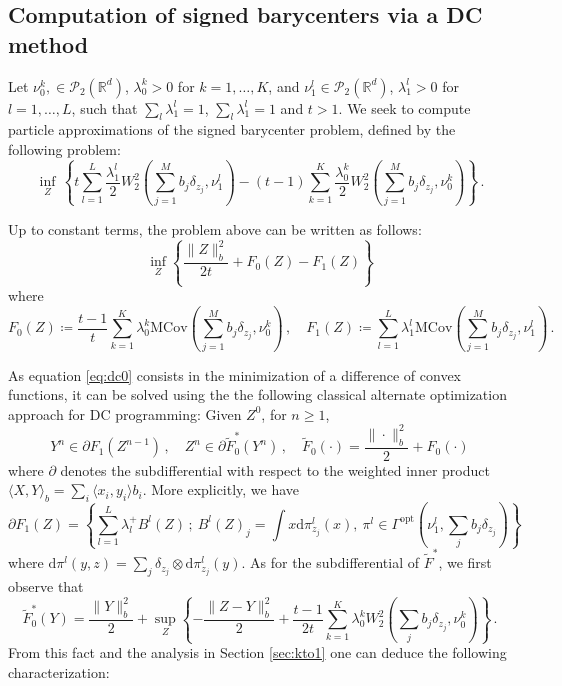 \documentclass[12pt]{amsart}
\numberwithin{equation}{section}
\let\mr=\mathrm
\theoremstyle{plain}
\theoremstyle{definition}
\begin{document}
\subsection{Computation of signed barycenters via a DC method}\label{sec:signeddc}
Let $\nu_0^k, \in \mathcal{P}_2(\mathbb{R}^d)$, $\lambda_0^k>0$ for $k=1,\ldots,K$, and $\nu_1^l \in \mathcal{P}_2(\mathbb{R}^d)$, $\lambda_1^l>0$ for $l=1,\ldots,L$, such that $\sum_l \lambda_1^l =1$, $\sum_l \lambda_1^l =1$ and $t>1$. We seek to compute particle approximations of the signed barycenter problem, defined by the following problem:
\[\inf_{Z} \, \left\{ t \sum_{l=1}^L \frac{\lambda_1^l}{2}  W^2_2\left(\sum_{j=1}^M b_j \delta_{z_j}, \nu_1^l \right) - (t-1)\sum_{k=1}^K \frac{\lambda_0^k}{2} W^2_2\left(\sum_{j=1}^M b_j \delta_{z_j}, \nu_0^k \right)\right\}\,.
\]


Up to constant terms, the problem above can be written as follows:
\begin{equation}\label{eq:dc0}
\inf_{Z} \left\{ \frac{\|Z\|_b^2}{2t} + F_0(Z) - F_1(Z) \right\}
\end{equation}
where
\[
 F_0(Z) \coloneqq \frac{t-1}{t} \sum_{k=1}^K \lambda_0^k \mathrm{MCov}\left( \sum_{j=1}^M b_j \delta_{z_j}, \nu_0^k \right)\,, \quad F_1(Z) \coloneqq \sum_{l=1}^L \lambda_1^l \mathrm{MCov}\left( \sum_{j=1}^M b_j \delta_{z_j}, \nu_1^l \right) \,.
\]

As equation \eqref{eq:dc0}  consists in the minimization of a difference of convex functions, it can be solved using the the following classical alternate optimization approach for DC programming:  Given $Z^0$, for $n\geq 1$,
\begin{equation}\label{eq:dc}
Y^n \in \partial F_1(Z^{n-1}) \,,\quad Z^n \in \partial \tilde{F}_0^*(Y^n) \,, \quad \tilde{F}_0(\cdot) = \frac{\|\cdot\|_b^2}{2} + F_0(\cdot) 
\end{equation}
where $\partial$ denotes the subdifferential with respect to the weighted inner product $\langle X,Y\rangle_b = \sum_i \langle x_i,y_i\rangle b_i$. More explicitly, we have 
\begin{equation} \label{eq:partialF1}
\partial F_1(Z) =  \left\{ \sum_{l=1}^L \lambda_l^+ B^l(Z)\,; ~ B^l(Z)_j =  \int x \mathrm{d} \pi^l_{z_j}(x), ~ \pi^l \in \Gamma^{\mr{opt}}\left( \nu_1^l, \sum_j b_j \delta_{z_j} \right) \right\}
\end{equation}
where $\mathrm{d}\pi^l(y,z) = \sum_j\delta_{z_j} \otimes \mathrm{d} \pi^l_{z_j}(y)$. As for the subdifferential of $\tilde{F}^*$, we first observe that 
\[
\tilde{F}^*_0(Y) = \frac{\|Y\|^2_b}{2} + \sup_Z \left\{-\frac{\|Z -Y\|^2_b}{2} +\frac{t-1}{2t} \sum_{k=1}^K \lambda_0^k W^2_2\left( \sum_j b_j \delta_{z_j} , \nu_0^k\right) \right\}\,.
\]
From this fact and the analysis in Section \ref{sec:kto1} one can deduce the following characterization:
\end{document}
